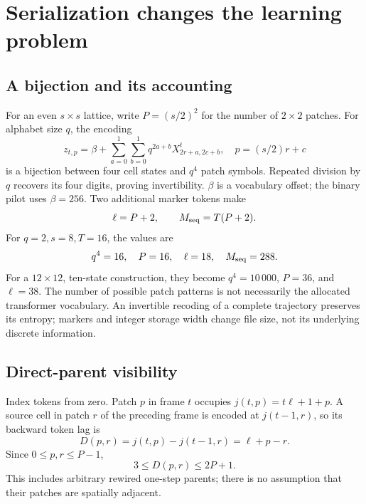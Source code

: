 \section{Serialization changes the learning problem}
\label{sec:serialization}

\subsection{A bijection and its accounting}

For an even $s\times s$ lattice, write $P=(s/2)^2$ for the number of
$2\times2$ patches. For alphabet size $q$, the encoding
\begin{equation}
 z_{t,p}=\beta+\sum_{a=0}^{1}\sum_{b=0}^{1}
        q^{2a+b}X^t_{2r+a,2c+b},
 \quad p=(s/2)r+c
 \label{eq:patch}
\end{equation}
is a bijection between four cell states and $q^4$ patch symbols.
Repeated division by $q$ recovers its four digits, proving invertibility.
$\beta$ is a vocabulary offset; the binary pilot uses $\beta=256$.
Two additional marker tokens make
\begin{equation}
 \ell=P+2,\qquad M_{\rm seq}=T(P+2).
\end{equation}
For $q=2,s=8,T=16$, the values are
\[
 q^4=16,\quad P=16,\quad\ell=18,\quad M_{\rm seq}=288.
\]
For a $12\times12$, ten-state construction, they become
$q^4=10\,000$, $P=36$, and $\ell=38$.
The number of possible patch patterns is not necessarily the allocated
transformer vocabulary. An invertible recoding of a complete trajectory
preserves its entropy; markers and integer storage width change file size,
not its underlying discrete information.

\subsection{Direct-parent visibility}

Index tokens from zero. Patch $p$ in frame $t$ occupies
$j(t,p)=t\ell+1+p$. A source cell in patch $r$ of the preceding frame
is encoded at $j(t-1,r)$, so its backward token lag is
\begin{equation}
 D(p,r)=j(t,p)-j(t-1,r)=\ell+p-r.
 \label{eq:lag}
\end{equation}
Since $0\leq p,r\leq P-1$,
\begin{equation}
 3\leq D(p,r)\leq2P+1.
 \label{eq:lagrange}
\end{equation}
This includes arbitrary rewired one-step parents; there is no assumption
that their patches are spatially adjacent.


